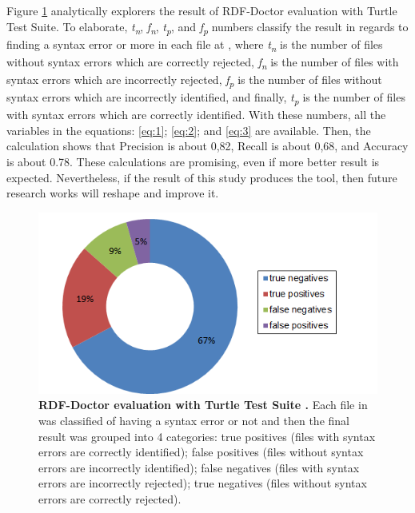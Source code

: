 Figure \ref{Fig:Experiment01} analytically explorers the result of RDF-Doctor evaluation  with Turtle Test Suite. To elaborate, \textit{t\textsubscript{n}}, 
\textit{f\textsubscript{n}}, 
\textit{t\textsubscript{p}}, 
and \textit{f\textsubscript{p}} numbers classify the result in regards to finding a syntax error  or more in each file at \cite{TurtleTests:Online}, where \textit{t\textsubscript{n}} is the number of files without syntax errors which are correctly rejected, \textit{f\textsubscript{n}} is  the number of files  with  syntax  errors  which are  incorrectly  rejected, \textit{f\textsubscript{p}} is the number of
 files without syntax errors  which are incorrectly identified, and finally, \textit{t\textsubscript{p}} is the number of files with syntax errors  which are correctly identified. With these numbers, all the variables in the equations: \ref{eq:1};  \ref{eq:2}; and \ref{eq:3} are available. Then, the calculation shows that Precision is about 0,82,  Recall is about 0,68, and Accuracy is about 0.78. These calculations are promising, even if more better result is expected. Nevertheless, if the result of this study produces the tool, then future research works will reshape and improve it.    
 
 
\begin{figure}
\begin{center}
		\includegraphics[scale=.8,angle=0]{images/Experiment01.png}
		\caption{\textbf{RDF-Doctor evaluation with Turtle Test Suite \cite{TurtleTests:Online}.} Each file in \cite{TurtleTests:Online} was classified of having a syntax error or not and then the final result was grouped into 4 categories: true positives (files with syntax errors are correctly identified); false positives (files without syntax errors are incorrectly identified); false negatives (files with syntax errors are incorrectly rejected); true negatives (files without syntax errors are correctly rejected).}
		\label{Fig:Experiment01}
\end{center}
\end{figure}

